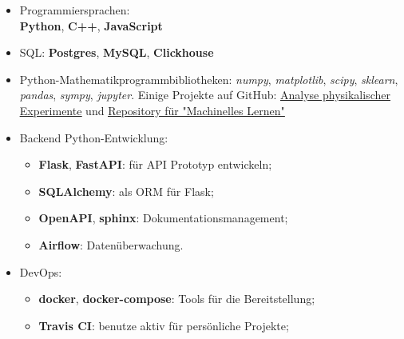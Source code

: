 \begin{itemize}
	\item Programmiersprachen: \\ 
        \textbf{Python}, \textbf{C++}, \textbf{JavaScript}
    \item SQL: \textbf{Postgres}, \textbf{MySQL}, \textbf{Clickhouse}
    \item Python-Mathematikprogrammbibliotheken: \textit{numpy}, \textit{matplotlib}, \textit{scipy}, \textit{sklearn}, \textit{pandas}, \textit{sympy}, \textit{jupyter}. 
    Einige Projekte auf GitHub: \href{https://github.com/alekseik1/phys\_labs}{\underline{Analyse physikalischer Experimente}} und \href{https://github.com/alekseik1/machine\_learning\_coursera}{\underline{Repository f\"ur "Machinelles Lernen"}}
    \item Backend Python-Entwicklung: 
        \begin{itemize}
            \item \textbf{Flask}, \textbf{FastAPI}: f\"ur API Prototyp entwickeln;
            \item \textbf{SQLAlchemy}: als ORM f\"ur Flask;
            \item \textbf{OpenAPI}, \textbf{sphinx}: Dokumentationsmanagement;
            \item \textbf{Airflow}: Daten\"uberwachung.
        \end{itemize}
    \item DevOps: 
        \begin{itemize}
            \item \textbf{docker}, \textbf{docker-compose}: Tools f\"ur die Bereitstellung;
            \item \textbf{Travis CI}: benutze aktiv f\"ur pers\"onliche Projekte;
        \end{itemize}
\end{itemize}



